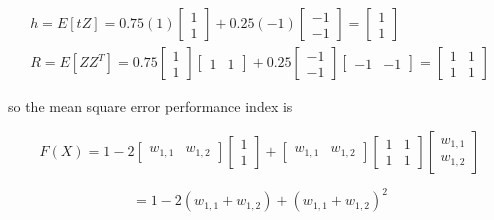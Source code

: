 \documentclass{article}
\begin{document}
\[\begin{array}{l} {h=E[tZ]=0.75(1)\left[\begin{array}{l} {1} \\ {1} \end{array}\right]+0.25(-1)\left[\begin{array}{l} {-1} \\ {-1} \end{array}\right]=\left[\begin{array}{l} {1} \\ {1} \end{array}\right]} \\ {R=E[ZZ^{T} ]=0.75\left[\begin{array}{l} {1} \\ {1} \end{array}\right]\left[\begin{array}{cc} {1} & {1} \end{array}\right]+0.25\left[\begin{array}{l} {-1} \\ {-1} \end{array}\right]\left[\begin{array}{cc} {-1} & {-1} \end{array}\right]=\left[\begin{array}{cc} {1} & {1} \\ {1} & {1} \end{array}\right]} \end{array}\] 


 so the mean square error performance index is

 
\[F(X)=1-2\left[\begin{array}{cc} {w_{1,1} } & {w_{1,2} } \end{array}\right]\left[\begin{array}{l} {1} \\ {1} \end{array}\right]+\left[\begin{array}{cc} {w_{1,1} } & {w_{1,2} } \end{array}\right]\left[\begin{array}{cc} {1} & {1} \\ {1} & {1} \end{array}\right]\left[\begin{array}{l} {w_{1,1} } \\ {w_{1,2} } \end{array}\right]\] 
          
\[=1-2(w_{1,1} +w_{1,2} )+(w_{1,1} +w_{1,2} )^{2} \] 
\end{document}
